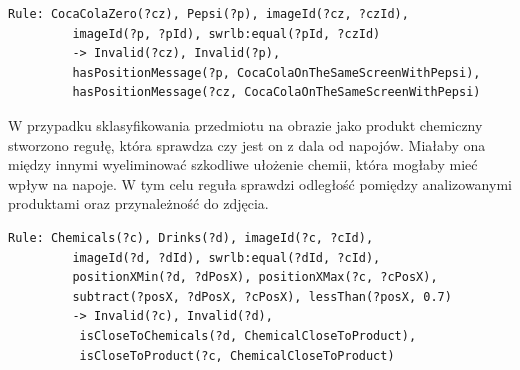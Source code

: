 \begin{itemize}
\begin{lstlisting}[caption={Reguła sprawdzająca czy indywidua klas Pepsi oraz CocaColaZero znajdują się na tym samym obrazie}]
Rule: CocaColaZero(?cz), Pepsi(?p), imageId(?cz, ?czId), 
		 imageId(?p, ?pId), swrlb:equal(?pId, ?czId) 
		 -> Invalid(?cz), Invalid(?p), 
		 hasPositionMessage(?p, CocaColaOnTheSameScreenWithPepsi),
		 hasPositionMessage(?cz, CocaColaOnTheSameScreenWithPepsi)
\end{lstlisting}

W przypadku sklasyfikowania przedmiotu na obrazie jako produkt chemiczny stworzono regułę, która sprawdza czy jest on z dala od napojów. Miałaby ona między innymi wyeliminować szkodliwe ułożenie chemii, która mogłaby mieć wpływ na napoje. W tym celu reguła sprawdzi odległość pomiędzy analizowanymi produktami oraz przynależność do zdjęcia.

\begin{lstlisting}[caption={Reguła sprawdzająca bliską odległość środka chemicznego od napoju}]
Rule: Chemicals(?c), Drinks(?d), imageId(?c, ?cId), 
		 imageId(?d, ?dId), swrlb:equal(?dId, ?cId), 
		 positionXMin(?d, ?dPosX), positionXMax(?c, ?cPosX),
		 subtract(?posX, ?dPosX, ?cPosX), lessThan(?posX, 0.7) 
		 -> Invalid(?c), Invalid(?d),
		  isCloseToChemicals(?d, ChemicalCloseToProduct), 
		  isCloseToProduct(?c, ChemicalCloseToProduct)
\end{lstlisting}


\end{itemize}